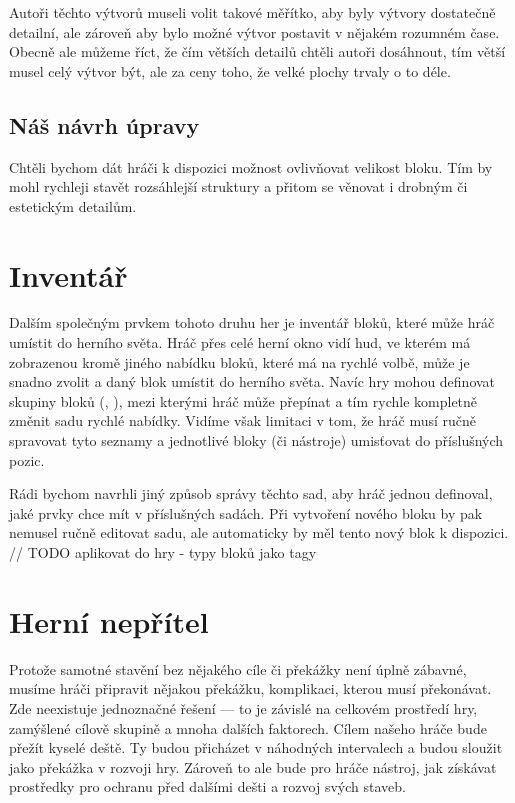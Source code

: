 Autoři těchto výtvorů museli volit takové měřítko, aby byly výtvory dostatečně detailní, ale zároveň aby bylo možné výtvor postavit v nějakém rozumném čase. Obecně ale můžeme říct, že čím větších detailů chtěli autoři dosáhnout, tím větší musel celý výtvor být, ale za ceny toho, že velké plochy trvaly o to déle.


\subsection{Náš návrh úpravy}
Chtěli bychom dát hráči k dispozici možnost ovlivňovat velikost bloku. Tím by mohl rychleji stavět rozsáhlejší struktury a přitom se věnovat i drobným či estetickým detailům.

\section{Inventář}
Dalším společným prvkem tohoto druhu her je inventář bloků, které může hráč umístit do herního světa. Hráč přes celé herní okno vidí \gls{hud}\citep{hud_terminology}, ve kterém má zobrazenou kromě jiného nabídku bloků, které má na rychlé volbě, může je snadno zvolit a daný blok umístit do herního světa. Navíc hry mohou definovat skupiny bloků (\SE{}, \ME{}), mezi kterými hráč může přepínat a tím rychle kompletně změnit sadu rychlé nabídky. Vidíme však limitaci v tom, že hráč musí ručně spravovat tyto seznamy a jednotlivé bloky (či nástroje) umisťovat do příslušných pozic.

Rádi bychom navrhli jiný způsob správy těchto sad, aby hráč jednou definoval, jaké prvky chce mít v příslušných sadách. Při vytvoření nového bloku by pak nemusel ručně editovat sadu, ale automaticky by měl tento nový blok k dispozici.  // TODO aplikovat do hry - typy bloků jako tagy

\section{Herní nepřítel}
Protože samotné stavění bez nějakého cíle či překážky není úplně zábavné, musíme hráči připravit nějakou překážku, komplikaci, kterou musí překonávat. Zde neexistuje jednoznačné řešení --- to je závislé na celkovém prostředí hry, zamýšlené cílově skupině a mnoha dalších faktorech. Cílem našeho hráče bude přežít kyselé deště. Ty budou přicházet v náhodných intervalech a budou sloužit jako překážka v rozvoji hry. Zároveň to ale bude pro hráče nástroj, jak získávat prostředky pro ochranu před dalšími dešti a rozvoj svých staveb. 


